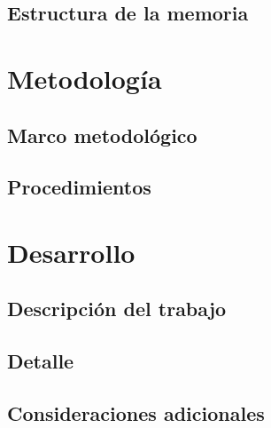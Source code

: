 \documentclass[a4paper,11pt]{report}
\begin{document}
\lipsum[4]

\section{Estructura de la memoria}

\lipsum[5]


\chapter{Metodología}
\label{chap:metodologia}

\lipsum[6]

\section{Marco metodológico}

\lipsum[7]

\section{Procedimientos}

\lipsum[8]


\chapter{Desarrollo}
\label{chap:desarrollo}

\lipsum[9]

\section{Descripción del trabajo}

\lipsum[10]

\section{Detalle}

\lipsum[11]

\section{Consideraciones adicionales}
\end{document}
